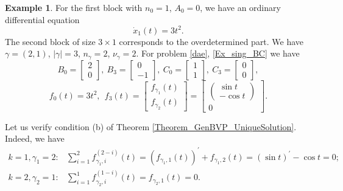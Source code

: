 \documentclass[preprint,12pt]{elsarticle}
\numberwithin{equation}{section}
\theoremstyle{definition}
\newtheorem{example}[theorem]{Example}
\begin{document}
\begin{example}
For the first block with $n_0=1$, $A_0=0$, we have an ordinary differential equation  \[\dot{x}_1(t)=3t^2.\] The second block of size $3\times 1$ corresponds to the overdetermined part. We have $\gamma=(2,1)$, $|\gamma|=3$, $n_{\gamma}=2$, $\nu_{\gamma}=2$. For problem \eqref{dae}, \eqref{Ex_sing_BC} we have
\begin{equation*}
    B_0=\begin{bmatrix}
        2\\0
    \end{bmatrix}, ~ B_3=\begin{bmatrix}
        0\\-1
    \end{bmatrix}, ~ C_0=\begin{bmatrix}
        1\\1
    \end{bmatrix}, ~ C_3=\begin{bmatrix}
       0\\0
    \end{bmatrix},
\end{equation*}
\begin{equation*}
    f_0(t)=3t^2, ~~f_3(t)=\begin{bmatrix}
        f_{\gamma_1}(t) \\ f_{\gamma_2}(t)
    \end{bmatrix}=\begin{bmatrix}
        \begin{pmatrix}
            \sin t \\ -\cos t
        \end{pmatrix}\\ 0
    \end{bmatrix}.
\end{equation*}

Let us verify condition (b) of Theorem \ref{Theorem_GenBVP_UniqueSolution}. Indeed, we have
\begin{equation*}\begin{array}{ll}
    k=1, \gamma_1=2: &  \sum\limits_{i=1}^2 f_{\gamma_1,i}^{(2-i)}(t)=\left(f_{\gamma_1,1}(t)\right)^\prime+f_{\gamma_1,2}(t)=\left(\sin t\right)^\prime-\cos t=0;\\
     k=2, \gamma_2=1: & \sum\limits_{i=1}^1f_{\gamma_2,i}^{(1-i)}(t)=f_{\gamma_2,1}(t)=0.
\end{array}
\end{equation*}


\end{example}
\end{document}
